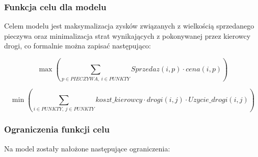 \documentclass[]{article}
\begin{document}
\subsubsection{Funkcja celu dla modelu}

Celem modelu jest maksymalizacja zysków związanych z wielkością sprzedanego pieczywa oraz minimalizacja strat wynikających z pokonywanej przez kierowcy drogi, co formalnie można zapisać następująco:

\[ \max \left( \sum_{p \in PIECZYWA,~i \in PUNKTY} Sprzedaz(i,p) \cdot cena(i,p) \right) \]

\[ \min \left( \sum_{i \in PUNKTY,~j \in PUNKTY} koszt\_kierowcy \cdot drogi(i,j) \cdot Uzycie\_drogi(i,j) \right) \]

\subsubsection{Ograniczenia funkcji celu}

Na model zostały nałożone następujące ograniczenia:
\end{document}
